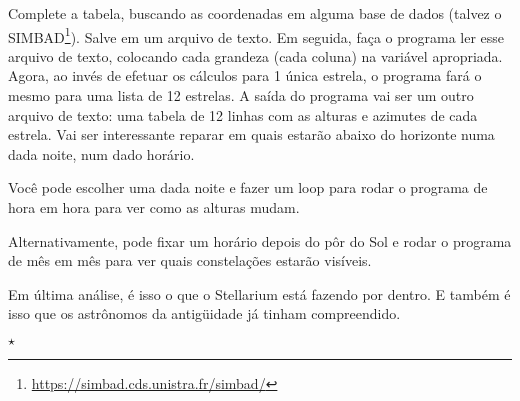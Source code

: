 \noindent Complete a tabela, buscando as coordenadas em alguma base de dados (talvez o SIMBAD\footnote{\url{https://simbad.cds.unistra.fr/simbad/}}). Salve em um arquivo de texto. Em seguida, faça o programa ler esse arquivo de texto, colocando cada grandeza (cada coluna) na variável apropriada. Agora, ao invés de efetuar os cálculos para 1 única estrela, o programa fará o mesmo para uma lista de 12 estrelas. A saída do programa vai ser um outro arquivo de texto: uma tabela de 12 linhas com as alturas e azimutes de cada estrela. Vai ser interessante reparar em quais estarão abaixo do horizonte numa dada noite, num dado horário.

Você pode escolher uma dada noite e fazer um loop para rodar o programa de hora em hora para ver como as alturas mudam.

Alternativamente, pode fixar um horário depois do pôr do Sol e rodar o programa de mês em mês para ver quais constelações estarão visíveis.

Em última análise, é isso o que o Stellarium está fazendo por dentro. E também é isso que os astrônomos da antigüidade já tinham compreendido.

\vspace{2cm}
\begin{center}
 $\star$
\end{center}
